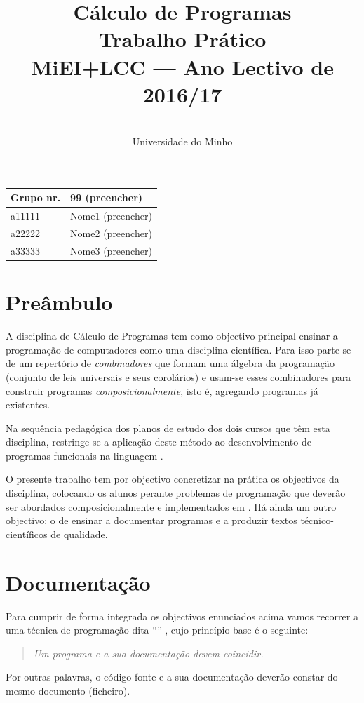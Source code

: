 \documentclass[a4paper]{article}
\title{
       	    Cálculo de Programas
\\
       	Trabalho Prático
\\
       	MiEI+LCC --- Ano Lectivo de 2016/17
}
\author{
       	\dium
\\
       	Universidade do Minho
}
\date\mydate
\begin{document}
\maketitle

\begin{center}\large
\begin{tabular}{ll}
\textbf{Grupo} nr. & 99 (preencher)
\\\hline
a11111 & Nome1 (preencher)	
\\
a22222 & Nome2 (preencher)	
\\
a33333 & Nome3 (preencher)	
\end{tabular}
\end{center}

\tableofcontents

\newpage

\section{Preâmbulo}

A disciplina de Cálculo de Programas tem como objectivo principal ensinar
a progra\-mação de computadores como uma disciplina científica. Para isso
parte-se de um repertório de \emph{combinadores} que formam uma álgebra da
programação (conjunto de leis universais e seus corolários) e usam-se esses
combinadores para construir programas \emph{composicionalmente}, isto é,
agregando programas já existentes.
  
Na sequência pedagógica dos planos de estudo dos dois cursos que têm esta
disciplina, restringe-se a aplicação deste método ao desenvolvimento de programas
funcionais na linguagem \Haskell.

O presente trabalho tem por objectivo concretizar na prática os objectivos
da disciplina, colocando os alunos perante problemas de programação que
deverão ser abordados composicionalmente e implementados em \Haskell.
Há ainda um outro objectivo: o de ensinar a documentar programas e
a produzir textos técnico-científicos de qualidade.

\section{Documentação}
Para cumprir de forma integrada os objectivos enunciados acima vamos recorrer
a uma técnica de programa\-ção dita ``'' \cite{Kn92}, cujo
princípio base é o seguinte:
\begin{quote}\em
Um programa e a sua documentação devem coincidir.
\end{quote}
Por outras palavras, o código fonte e a sua documentação deverão constar
do mesmo documento (ficheiro).
\end{document}

